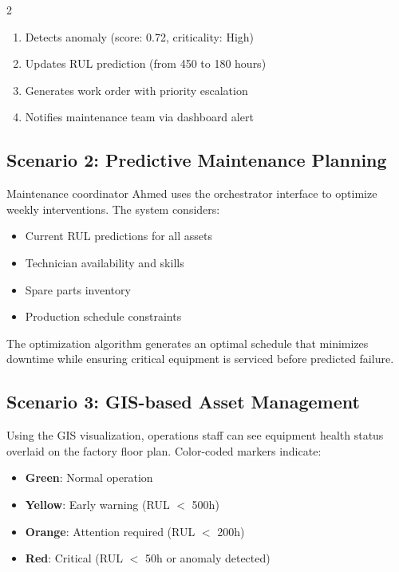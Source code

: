 \documentclass{ijceds} %
\begin{document}
\begin{multicols}{2}
\begin{enumerate}
    \item Detects anomaly (score: 0.72, criticality: High)
    \item Updates RUL prediction (from 450 to 180 hours)
    \item Generates work order with priority escalation
    \item Notifies maintenance team via dashboard alert
\end{enumerate}

\subsection{Scenario 2: Predictive Maintenance Planning}

Maintenance coordinator Ahmed uses the orchestrator interface to optimize weekly interventions. The system considers:

\begin{itemize}
    \item Current RUL predictions for all assets
    \item Technician availability and skills
    \item Spare parts inventory
    \item Production schedule constraints
\end{itemize}

The optimization algorithm generates an optimal schedule that minimizes downtime while ensuring critical equipment is serviced before predicted failure.

\subsection{Scenario 3: GIS-based Asset Management}

Using the GIS visualization, operations staff can see equipment health status overlaid on the factory floor plan. Color-coded markers indicate:

\begin{itemize}
    \item \textbf{Green}: Normal operation
    \item \textbf{Yellow}: Early warning (RUL $<$ 500h)
    \item \textbf{Orange}: Attention required (RUL $<$ 200h)
    \item \textbf{Red}: Critical (RUL $<$ 50h or anomaly detected)
\end{itemize}


\end{multicols}
\end{document}
